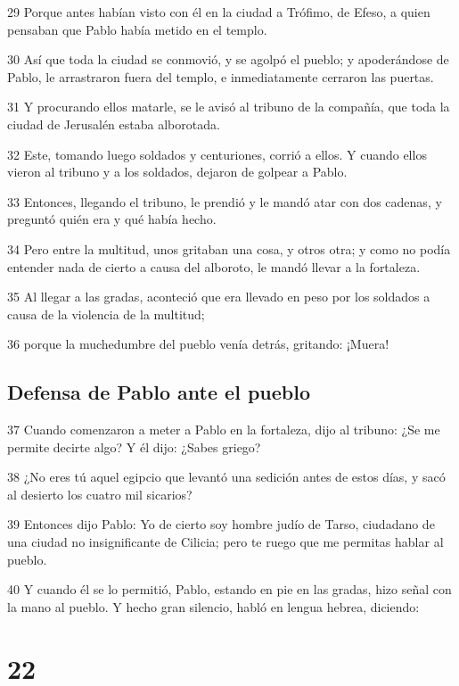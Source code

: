 \par 29 Porque antes habían visto con él en la ciudad a Trófimo, de Efeso, a quien pensaban que Pablo había metido en el templo.
\par 30 Así que toda la ciudad se conmovió, y se agolpó el pueblo; y apoderándose de Pablo, le arrastraron fuera del templo, e inmediatamente cerraron las puertas.
\par 31 Y procurando ellos matarle, se le avisó al tribuno de la compañía, que toda la ciudad de Jerusalén estaba alborotada.
\par 32 Este, tomando luego soldados y centuriones, corrió a ellos. Y cuando ellos vieron al tribuno y a los soldados, dejaron de golpear a Pablo.
\par 33 Entonces, llegando el tribuno, le prendió y le mandó atar con dos cadenas, y preguntó quién era y qué había hecho.
\par 34 Pero entre la multitud, unos gritaban una cosa, y otros otra; y como no podía entender nada de cierto a causa del alboroto, le mandó llevar a la fortaleza.
\par 35 Al llegar a las gradas, aconteció que era llevado en peso por los soldados a causa de la violencia de la multitud;
\par 36 porque la muchedumbre del pueblo venía detrás, gritando: ¡Muera!

\section*{Defensa de Pablo ante el pueblo}

\par 37 Cuando comenzaron a meter a Pablo en la fortaleza, dijo al tribuno: ¿Se me permite decirte algo? Y él dijo: ¿Sabes griego?
\par 38 ¿No eres tú aquel egipcio que levantó una sedición antes de estos días, y sacó al desierto los cuatro mil sicarios?
\par 39 Entonces dijo Pablo: Yo de cierto soy hombre judío de Tarso, ciudadano de una ciudad no insignificante de Cilicia; pero te ruego que me permitas hablar al pueblo.
\par 40 Y cuando él se lo permitió, Pablo, estando en pie en las gradas, hizo señal con la mano al pueblo. Y hecho gran silencio, habló en lengua hebrea, diciendo:

\chapter{22}

